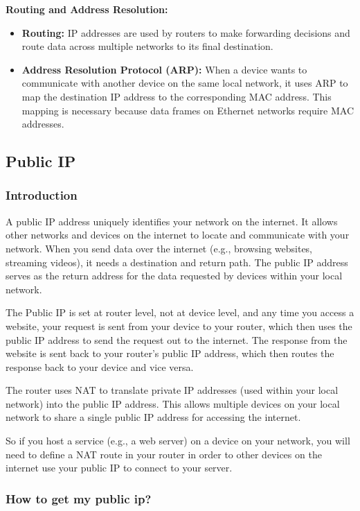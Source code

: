 \documentclass{article}
\begin{document}
\textbf{Routing and Address Resolution:}

\begin{itemize}
    \item \textbf{Routing:} IP addresses are used by routers to make forwarding decisions and route data across multiple networks to its final destination.
    \item \textbf{Address Resolution Protocol (ARP):} When a device wants to communicate with another device on the same local network, it uses ARP to map the destination IP address to the corresponding MAC address. This mapping is necessary because data frames on Ethernet networks require MAC addresses.
\end{itemize}

\subsection{Public IP}

\subsubsection{Introduction}
A public IP address uniquely identifies your network on the internet. It allows other networks and devices on the internet to locate and communicate with your network. When you send data over the internet (e.g., browsing websites, streaming videos), it needs a destination and return path. The public IP address serves as the return address for the data requested by devices within your local network.

The Public IP is set at router level, not at device level, and any time you access a website, your request is sent from your device to your router, which then uses the public IP address to send the request out to the internet. The response from the website is sent back to your router's public IP address, which then routes the response back to your device and vice versa.

The router uses NAT to translate private IP addresses (used within your local network) into the public IP address. This allows multiple devices on your local network to share a single public IP address for accessing the internet.

So if you host a service (e.g., a web server) on a device on your network, you will need to define a NAT route in your router in order to other devices on the internet use your public IP to connect to your server.

\subsubsection{How to get my public ip?}
\end{document}

